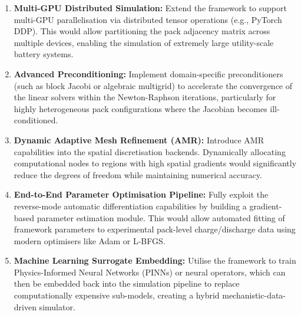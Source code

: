 \begin{enumerate}
  \item \textbf{Multi-GPU Distributed Simulation:} Extend the framework to support multi-GPU parallelisation via distributed tensor operations (e.g., PyTorch DDP). This would allow partitioning the pack adjacency matrix across multiple devices, enabling the simulation of extremely large utility-scale battery systems.

  \item \textbf{Advanced Preconditioning:} Implement domain-specific preconditioners (such as block Jacobi or algebraic multigrid) to accelerate the convergence of the linear solvers within the Newton-Raphson iterations, particularly for highly heterogeneous pack configurations where the Jacobian becomes ill-conditioned.

  \item \textbf{Dynamic Adaptive Mesh Refinement (AMR):} Introduce AMR capabilities into the spatial discretisation backends. Dynamically allocating computational nodes to regions with high spatial gradients would significantly reduce the degrees of freedom while maintaining numerical accuracy.

  \item \textbf{End-to-End Parameter Optimisation Pipeline:} Fully exploit the reverse-mode automatic differentiation capabilities by building a gradient-based parameter estimation module. This would allow automated fitting of framework parameters to experimental pack-level charge/discharge data using modern optimisers like Adam or L-BFGS.

  \item \textbf{Machine Learning Surrogate Embedding:} Utilise the framework to train Physics-Informed Neural Networks (PINNs) or neural operators, which can then be embedded back into the simulation pipeline to replace computationally expensive sub-models, creating a hybrid mechanistic-data-driven simulator.
\end{enumerate}
